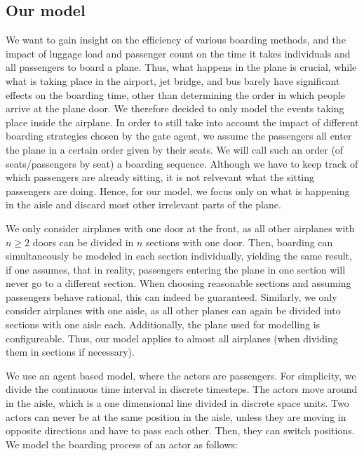 \documentclass[11pt]{article}
\begin{document}
\subsection{Our model}\label{ourmodel}

We want to gain insight on the efficiency of various boarding methods, and the impact of luggage load and passenger count on the time it takes individuals and all passengers to board a plane. Thus, what happens in the plane is crucial, while what is taking place in the airport, jet bridge, and bus barely have significant effects on the boarding time, other than determining the order in which people arrive at the plane door. We therefore decided to only model the events taking place inside the airplane. In order to still take into account the impact of different boarding strategies chosen by the gate agent, we assume the passengers all enter the plane in a certain order given by their seats. We will call such an order (of seats/passengers by seat) a boarding sequence.
Although we have to keep track of which passengers are already sitting, it is not relvevant what the sitting passengers are doing. Hence, for our model, we focus only on what is happening in the aisle and discard most other irrelevant parts of the plane.

We only consider airplanes with one door at the front, as all other airplanes with $n \geq 2$ doors can be divided in $n$ sections with one door. Then, boarding can simultaneously be modeled in each section individually, yielding the same result, if one assumes, that in reality, passengers entering the plane in one section will never go to a different section.
When choosing reasonable sections and assuming passengers behave rational, this can indeed be guaranteed. Similarly, we only consider airplanes with one aisle, as all other planes can again be divided into sections with one aisle each. Additionally, the plane used for modelling is configureable. Thus, our model applies to almost all airplanes (when dividing them in sections if necessary).

We use an agent based model, where the actors are passengers. For simplicity, we divide the continuous time interval in discrete timesteps. The actors move around in the aisle, which is a one dimensional line divided in discrete space units. Two actors can never be at the same position in the aisle, unless they are moving in opposite directions and have to pass each other. Then, they can switch positions. We model the boarding process of an actor as follows:
\end{document}
